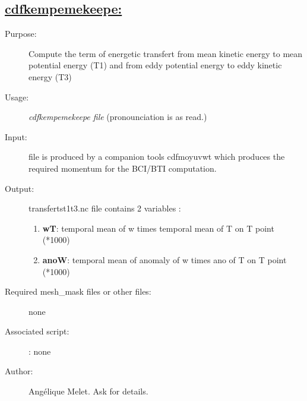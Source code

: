 \documentclass[a4paper,11pt]{article}
\begin{document}
\subsection*{\underline{cdfkempemekeepe:}}
\begin{description}
\item[Purpose:] Compute the term of energetic transfert
  from mean kinetic energy to mean potential energy (T1)
  and from eddy potential energy to eddy kinetic energy (T3)
\item[Usage:] {\em cdfkempemekeepe  file } (pronounciation is as read.)
\item[Input:] file is produced by a companion tools cdfmoyuvwt which produces the required momentum for the BCI/BTI computation.
\item[Output:] transfertst1t3.nc file contains 2 variables : 
     \begin{enumerate} 
        \item {\bf wT}:  temporal mean of w times temporal mean of T on T point (*1000)
        \item {\bf anoW}: temporal mean of anomaly of w times ano of T on T point (*1000)
      \end{enumerate}
\item[Required mesh\_mask files or other files:] none
\item[Associated script:] : none
\item[Author:] Ang\'elique Melet. Ask for details.
\end{description}
\end{document}
